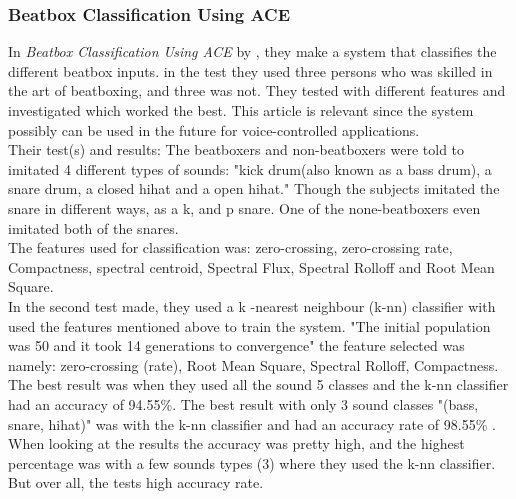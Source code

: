 \subsubsection{Beatbox Classification Using ACE}
In \textit{Beatbox Classification Using ACE} by \citep{Sinyor05}, they make a system that classifies the different beatbox inputs. in the test they used three persons who was skilled in the art of beatboxing, and three was not. \citep{Sinyor05} They tested with different features and investigated which worked the best. This article is relevant since the system possibly can be used in the future for voice-controlled applications.\\
Their test(s) and results:
The beatboxers and non-beatboxers were told to imitated 4 different types of sounds: "kick drum(also known as a bass drum), a snare drum, a closed hihat and a open hihat."\citep{Sinyor05} Though the subjects imitated the snare in different ways, as a k, and p snare. One of the none-beatboxers even imitated both of the snares.\\
The features \citep{Sinyor05} used for classification was: zero-crossing, zero-crossing rate, Compactness, spectral centroid, Spectral Flux, Spectral Rolloff and Root Mean Square\citep{Sinyor05}.\\
In the second test \citep{Sinyor05} made, they used a k -nearest neighbour (k-nn) classifier with used the features mentioned above to train the system. "The initial population was 50 and it took 14 generations to convergence" \citep{Sinyor05} the feature selected was namely: zero-crossing (rate), Root Mean Square, Spectral Rolloff, Compactness.\\ 
The best result was when they used all the sound 5 classes and the k-nn classifier had an accuracy of 94.55\%. The best result with only 3 sound classes "(bass, snare, hihat)" \citep{Sinyor05} was with the k-nn classifier and had an accuracy rate of 98.55\% \citep{Sinyor05}.\\
When looking at the results the accuracy was pretty high, and the highest percentage was with a few sounds types (3)  where they used the k-nn classifier. But over all, the tests high accuracy rate.

